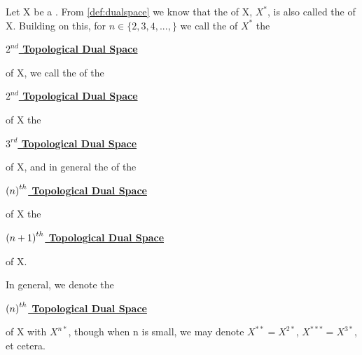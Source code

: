 \label{def:higherorderdualspaces}
\newcommand{\SecondTopDualSpace}[0]{ 
    \bf \hyperref[def:higherorderdualspaces]{$2^{nd}$ Topological Dual Space} \rm 
}
\newcommand{\ThirdTopDualSpace}[0]{ 
    \bf \hyperref[def:higherorderdualspaces]{$3^{rd}$ Topological Dual Space} \rm 
}
\newcommand{\NthTopDualSpace}[1]{
    \bf \hyperref[def:higherorderdualspaces]{$\pa{#1}^{th}$ Topological Dual Space} \rm
}
\begin{df}
    Let X be a 
   \SeminormedSpace. 
    From 
    \ref{def:dualspace}
    we know that the 
    \TopDualSpace
    of X, 
    $X^*$, 
    is also called the 
    \FirstTopDualSpace
    of X. 
    Building on this, 
    for $n \in \{2, 3, 4, ..., \}$
    we call the 
    \FirstTopDualSpace
    of $X^*$ the 
    \SecondTopDualSpace
    of X, 
    we call the 
    \FirstTopDualSpace
    of the 
    \SecondTopDualSpace
    of X the 
    \ThirdTopDualSpace
    of X, and 
    in general the 
    \FirstTopDualSpace
    of the 
    \NthTopDualSpace{n}
    of X
    the 
    \NthTopDualSpace{n+1}
    of X. 
   
    In general, we denote the 
    \NthTopDualSpace{n}
    of X with 
    $X^{n*}$, 
    though when n is small, 
    we may denote 
    $X^{**}=X^{2*}$, $X^{***}=X^{3*}$, 
    et cetera. 


\end{df}
